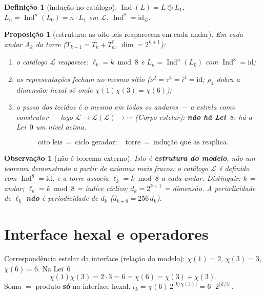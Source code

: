 \documentclass[11pt,a4paper]{article}
\newtheorem{definicao}{Definição}
\newtheorem{proposicao}{Proposição}
\newtheorem{observacao}{Observação}
\begin{document}
\begin{definicao}[indução no catálogo]\label{def:ind}
$\operatorname{Ind}(L)=L\oplus L_1$,
$L_n=\operatorname{Ind}^{n}(L_0)=n\cdot L_1$ em $\mathcal L$.
$\operatorname{Ind}^{8}=\mathrm{id}_{\mathcal L}$.
\end{definicao}

\begin{proposicao}[estrutura: as oito leis reaparecem em cada andar]\label{thm:induz}
Em cada andar $A_k$ da torre ($T_{k+1}=T_k+T_k^{*}$, $\dim=2^{k+1}$):
\begin{enumerate}
\item o catálogo $\mathcal L$ reaparece: $\ell_k=k\bmod8$ e
$L_n=\operatorname{Ind}^{n}(L_0)$ com $\operatorname{Ind}^{8}=\mathrm{id}$;
\item as representações fecham no mesmo sítio
($\nu^{2}=\tau^{3}=i^{4}=\mathrm{id}$; $\rho_4$ dobra a dimensão;
hexal só onde $\chi(1)\chi(3)=\chi(6)$);
\item o passo dos tecidos é o \emph{mesmo} em todos os andares --- a
estrela como construtor --- logo
$\mathcal L\to\mathcal L(\mathcal L)\to\cdots$
(\emph{Corpo estelar}): \textbf{não há Lei~$8$}, há a Lei~$0$ um nível
acima.
\end{enumerate}
\[
\boxed{
\text{oito leis}\ =\ \text{ciclo gerador};\quad
\text{torre}\ =\ \text{indução que as reaplica}.
}
\]
\end{proposicao}

\begin{observacao}[não é teorema externo]
Isto é \textbf{estrutura do modelo}, não um teorema demonstrado a
partir de axiomas mais fracos: o catálogo $\mathcal L$ é definido com
$\operatorname{Ind}^{8}=\mathrm{id}$, e a torre associa
$\ell_k=k\bmod8$ a cada andar. Distinguir:
$k$ = andar; $\ell_k=k\bmod8$ = índice cíclico; $d_k=2^{k+1}$ =
dimensão. A periodicidade de $\ell_k$ \textbf{não} é periodicidade de
$d_k$ ($d_{k+8}=256\,d_k$).
\end{observacao}

\section{Interface hexal e operadores}

Correspondência estelar da interface (relação do modelo):
$\chi(1)=2$, $\chi(3)=3$, $\chi(6)=6$. Na Lei~6
\[
\boxed{\chi(1)\chi(3)=2\cdot3=6=\chi(6)=\chi(3)+\chi(3).}
\]
Soma $=$ produto \textbf{só} na interface hexal.
$\iota_k=\chi(6)\,2^{\lfloor k/\chi(3)\rfloor}=6\cdot2^{\lfloor k/3\rfloor}$.
\end{document}
